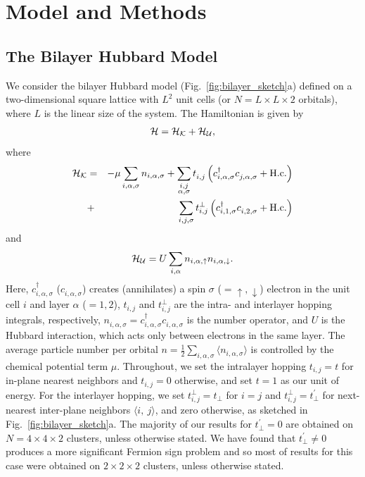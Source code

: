 \documentclass[prb,twocolumn,amsmath,amssymb,superscriptaddress,floatfix,nofootinbib]{revtex4-2}
\newcommand{\pdag}{{\phantom\dagger}}
\begin{document}
\section{Model and Methods}\label{Sec:Methods}
\subsection{The Bilayer Hubbard Model}
We consider the bilayer Hubbard model (Fig.~\ref{fig:bilayer_sketch}a) defined on a two-dimensional square lattice with $L^2$ unit cells (or $N = L\times L \times 2$ orbitals), where $L$ is the linear size of the system. The Hamiltonian is given by
\begin{eqnarray}
  {\cal H} = {\cal H}_{\cal K} + {\cal H}_{\cal U},
  \label{eq:Hmodel}
\end{eqnarray}
where
\begin{eqnarray}
  {\cal H}_{\cal K}&=&- \mu \sum_{i,\alpha,\sigma} n_{i,\alpha,\sigma} + \sum_{\substack{i,j\nonumber\\ \alpha, \sigma}} 
  t^{\phantom\dagger}_{i,j}\left(c^\dag_{i,\alpha,\sigma} c^\pdag_{j,\alpha,\sigma}  + {\rm H. c.} \right) \\
  &+& \sum_{i,j,\sigma} t^{\perp}_{i,j} \left(c^\dag_{i,1,\sigma} c^\pdag_{i,2,\sigma}  + {\rm H. c.} \right) 
  \label{eq:Hk}
\end{eqnarray}
and
\begin{equation}
  {\cal H}_{\cal U} =  U \sum_{i,\alpha} n_{i,\alpha,\uparrow} n_{i,\alpha,\downarrow}.
  \label{eq:HU}
\end{equation}  
Here, $c^\dag_{i,\alpha,\sigma}$ ($c^\pdag_{i,\alpha,\sigma}$) creates (annihilates) a spin $\sigma$ ($=\uparrow,\downarrow$) electron in the unit cell $i$ and layer $\alpha$ ($=1,2$), $t_{i,j}$ and $t^\perp_{i,j}$ are the intra- and interlayer hopping integrals, respectively,  $n^{\phantom\dagger}_{i,\alpha,\sigma} = c^\dag_{i,\alpha,\sigma} c^{\phantom\dagger}_{i,\alpha,\sigma}$ is the number operator, and $U$ is the Hubbard interaction, which acts only between electrons in the same layer. The average particle number per orbital $n = \frac{1}{2}\sum_{i,\alpha,\sigma}\langle n_{i,\alpha,\sigma}\rangle$ is controlled by the chemical potential term $\mu$. Throughout, we set the intralayer hopping  $t_{i,j} = t$ for in-plane nearest neighbors and $t_{i,j} = 0$ otherwise, and set $t = 1$ as our unit of energy. For the interlayer hopping, we set $t^\perp_{i,j} = t_\perp$ for $i = j$ and $t^{\perp}_{i,j} = t_\perp^{\prime}$ for next-nearest inter-plane neighbors $\langle i,~j\rangle$, and zero otherwise, as sketched in Fig.~\ref{fig:bilayer_sketch}a. The majority of our results for $t_\perp^\prime = 0$ are obtained on $N = 4\times 4\times 2$ clusters, unless otherwise stated. We have found that $t^\prime_\perp \ne 0$ produces a more significant Fermion sign problem and so most of results for this case were obtained on $2\times 2\times 2$ clusters, unless otherwise stated. 
\end{document}
